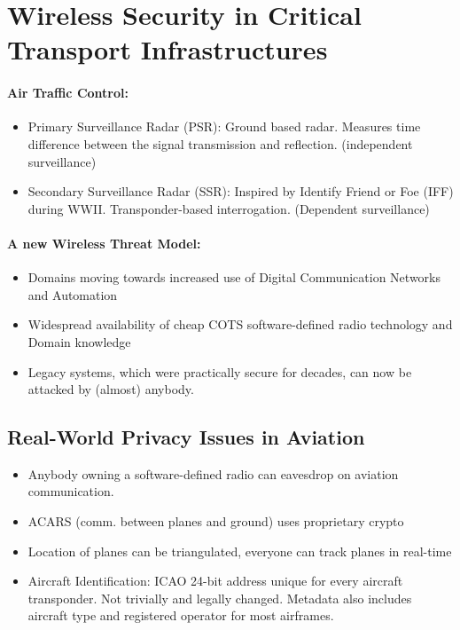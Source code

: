 \section{Wireless Security in Critical Transport Infrastructures}

\paragraph{Air Traffic Control:}
\begin{itemize}
    \item Primary Surveillance Radar (PSR): Ground based radar. Measures time difference between the signal transmission and reflection. (independent surveillance)
    \item Secondary Surveillance Radar (SSR): Inspired by Identify Friend or Foe (IFF) during WWII. Transponder-based interrogation. (Dependent surveillance)
\end{itemize}

\paragraph{A new Wireless Threat Model:}
\begin{itemize}
    \item Domains moving towards increased use of Digital Communication Networks and Automation
    \item Widespread availability of cheap COTS software-defined radio technology and Domain knowledge
    \item Legacy systems, which were practically secure for decades, can now be attacked by (almost) anybody.
\end{itemize}

\subsection{Real-World Privacy Issues in Aviation}

\begin{itemize}
    \item Anybody owning a software-defined radio can eavesdrop on aviation communication.
    \item ACARS (comm. between planes and ground) uses proprietary crypto
    \item Location of planes can be triangulated, everyone can track planes in real-time
    \item Aircraft Identification: ICAO 24-bit address unique for every aircraft transponder. Not trivially and legally changed. Metadata also includes aircraft type and registered operator for most airframes.
\end{itemize}

